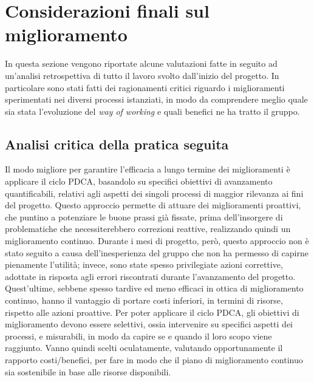
\section{Considerazioni finali sul miglioramento}
	In questa sezione vengono riportate alcune valutazioni fatte in seguito ad un'analisi retrospettiva di tutto il lavoro svolto dall'inizio del progetto. In particolare sono stati fatti dei ragionamenti critici riguardo i miglioramenti sperimentati nei diversi processi istanziati, in modo da comprendere meglio quale sia stata l'evoluzione del \textit{way of working} e quali benefici ne ha tratto il gruppo.
	
	\subsection{Analisi critica della pratica seguita}
		Il modo migliore per garantire l'efficacia a lungo termine dei miglioramenti è applicare il ciclo PDCA, basandolo su specifici obiettivi di avanzamento quantificabili, relativi agli aspetti dei singoli processi di maggior rilevanza ai fini del progetto. Questo approccio permette di attuare dei miglioramenti proattivi, che puntino a potenziare le buone prassi già fissate, prima dell'insorgere di problematiche che necessiterebbero correzioni reattive, realizzando quindi un miglioramento continuo.
		\newline
		Durante i mesi di progetto, però, questo approccio non è stato seguito a causa dell'inesperienza del gruppo che non ha permesso di capirne pienamente l'utilità; invece, sono state spesso privilegiate azioni correttive, adottate in risposta agli errori riscontrati durante l'avanzamento del progetto. Quest'ultime, sebbene spesso tardive ed meno efficaci in ottica di miglioramento continuo, hanno il vantaggio di portare costi inferiori, in termini di risorse, rispetto alle azioni proattive.
		\newline
		Per poter applicare il ciclo PDCA, gli obiettivi di miglioramento devono essere selettivi, ossia intervenire su specifici aspetti dei processi, e misurabili, in modo da capire se e quando il loro scopo viene raggiunto. Vanno quindi scelti oculatamente, valutando opportunamente il rapporto costi/benefici, per fare in modo che il piano di miglioramento continuo sia sostenibile in base alle risorse disponibili.
	
